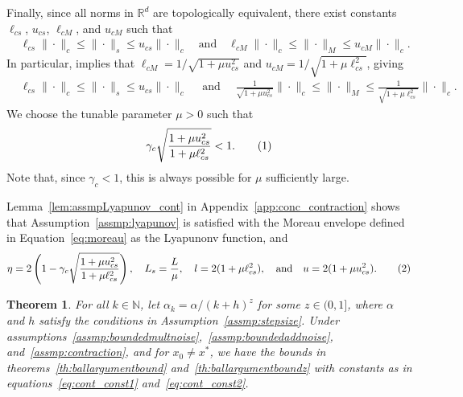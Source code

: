\documentclass{article}
\newcommand{\numberthis}{\addtocounter{equation}{1}\tag{\theequation}}
\newcommand{\R}{\mathbb{R}}
\newcommand{\N}{\mathbb{N}}
\newcommand{\lcm}{\ell_{cM}}
\newcommand{\ucm}{u_{cM}}
\newcommand{\lcs}{\ell_{cs}}
\newcommand{\ucs}{u_{cs}}
\newtheorem{theorem}{Theorem}[section]
\begin{document}
Finally, since all norms in $\R^d$ are topologically equivalent, there exist constants $\lcs$, $\ucs$, $\lcm$, and $\ucm$ such that 
\begin{align*}
    &\lcs\|\cdot\|_c \le \|\cdot\|_s \le \ucs \|\cdot\|_c \quad \text{and} \quad \lcm\|\cdot\|_c \le \|\cdot\|_M \le \ucm \|\cdot\|_c.
\end{align*}
In particular, \cite[Lemma 2.1]{chen2020finite} implies that $\lcm = 1/\sqrt{1 + \mu \ucs^2}$ and $\ucm = 1/\sqrt{1 + \mu \lcs^2}$, giving
\begin{align*}
    &\lcs\|\cdot\|_c \le \|\cdot\|_s \le \ucs \|\cdot\|_c \quad \text{ and } \quad \frac{1}{\sqrt{1 + \mu \ucs^2}}\|\cdot\|_c \le \|\cdot\|_M \le \frac{1}{\sqrt{1 + \mu \lcs^2}} \|\cdot\|_c.
\end{align*}
We choose the tunable parameter $\mu > 0$ such that
\[ \gamma_c \sqrt{\frac{1 + \mu \ucs^2}{1 + \mu \lcs^2}} < 1. \numberthis\label{eq:muassmp} \]
Note that, since $\gamma_c<1$, this is always possible for $\mu$ sufficiently large.

\medskip

Lemma~\ref{lem:assmpLyapunov_cont} in Appendix~\ref{app:conc_contraction} shows that Assumption~\ref{assmp:lyapunov} is satisfied with the Moreau envelope defined in Equation~\eqref{eq:moreau} as the Lyapunonv function, and 
\begin{align*}
    \eta = 2\left(1- \gamma_c \sqrt{\frac{1 + \mu \ucs^2}{1 + \mu \lcs^2}} \right), \quad L_s= \frac{L}{\mu}, \quad l = 2 (1 + \mu \lcs^2),\quad \text{and} \quad u = 2 (1 + \mu \ucs^2).\numberthis\label{eq:cont_const2}
\end{align*}

\begin{theorem}\label{th:contractiveconc}
    For all $k\in\N$, let $\alpha_k = \alpha/(k+h)^z$ for some $z\in(0,1]$, where $\alpha$ and $h$ satisfy the conditions in Assumption~\ref{assmp:stepsize}. Under assumptions~\ref{assmp:boundedmultnoise},~\ref{assmp:boundedaddnoise}, and~\ref{assmp:contraction}, and for $x_0 \ne x^*$, we have the bounds in theorems~\ref{th:ballargumentbound} and~\ref{th:ballargumentboundz} with constants as in equations~\eqref{eq:cont_const1} and~\eqref{eq:cont_const2}.
\end{theorem}
\end{document}
